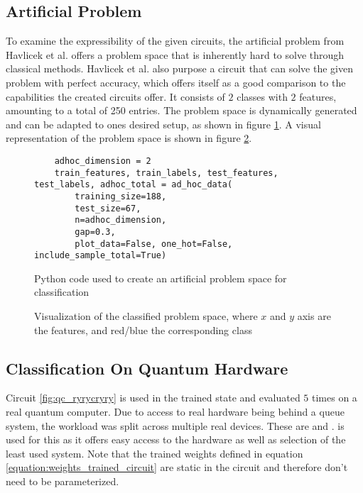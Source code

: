 \subsection{Artificial Problem}
\label{chapter:artificial_problem}

To examine the expressibility of the given circuits, the artificial problem from Havlicek et al. \cite{havlicek_supervised_2019} offers a problem space that is inherently hard to solve through classical methods. Havlicek et al. also purpose a circuit that can solve the given problem with perfect accuracy, which offers itself as a good comparison to the capabilities the created circuits offer. It consists of $2$ classes with $2$ features, amounting to a total of 250 entries. The problem space is dynamically generated and can be adapted to ones desired setup, as shown in figure \ref{fig:ad_hoc_code}. A visual representation of the problem space is shown in figure \ref{fig:problem_space_plot}.

\begin{figure}[!ht]
    \centering
    \begin{verbatim}
    adhoc_dimension = 2
    train_features, train_labels, test_features, test_labels, adhoc_total = ad_hoc_data(
        training_size=188,
        test_size=67,
        n=adhoc_dimension,
        gap=0.3,
        plot_data=False, one_hot=False, include_sample_total=True)
    \end{verbatim}
    \caption{Python code used to create an artificial problem space for classification}
    \label{fig:ad_hoc_code}
\end{figure}

\begin{figure}
    \centering
    \scalebox{0.75}{
        
    }
    \caption{Visualization of the classified problem space, where $x$ and $y$ axis are the features, and red/blue the corresponding class}
    \label{fig:problem_space_plot}
\end{figure}

\clearpage
\subsection{Classification On Quantum Hardware}
Circuit \ref{fig:qc_ryrycryry} is used in the trained state and evaluated $5$ times on a real quantum computer. Due to access to real hardware being behind a queue system, the workload was split across multiple real devices. These are  and .  is used for this as it offers easy access to the hardware as well as selection of the least used system. Note that the trained weights defined in equation \ref{equation:weights_trained_circuit} are static in the circuit and therefore don't need to be parameterized.

